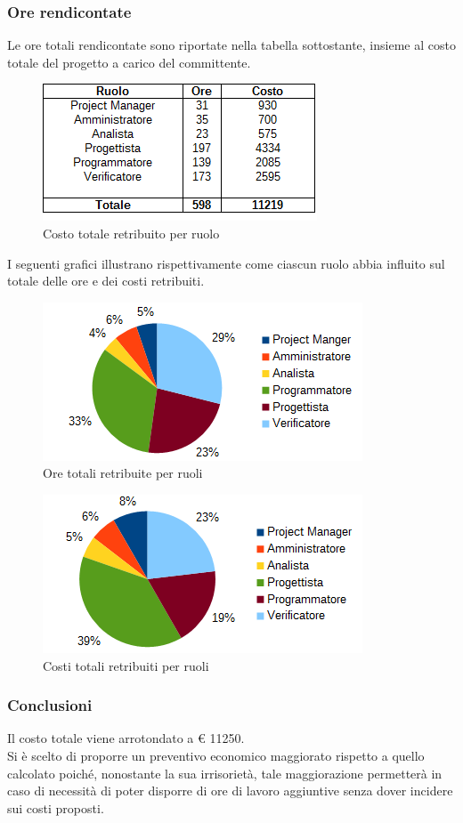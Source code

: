 		\subsubsection{Ore rendicontate}
		Le ore totali rendicontate sono riportate nella tabella sottostante, insieme al costo totale del progetto a carico del committente. \\
		\begin{figure}[H]
			\centering
			\includegraphics[scale=0.75]{immagini/tabelle/orario_rendicontato-costo.png}
			\caption{Costo totale retribuito per ruolo}
		\end{figure}
		I seguenti grafici illustrano rispettivamente come ciascun ruolo abbia influito sul totale delle ore e dei costi retribuiti. \\
		\begin{figure}[H]
		\centering
			\includegraphics[scale=1]{immagini/grafici/orario_rendicontato-torta.png}
			\caption{Ore totali retribuite per ruoli}
		\end{figure}
		\begin{figure}[H]
			\centering
			\includegraphics[scale=1]{immagini/grafici/orario_rendicontato-torta-costo.png}
			\caption{Costi totali retribuiti per ruoli}
		\end{figure}
		\subsubsection{Conclusioni}
		Il costo totale viene arrotondato a € 11250. \\
		Si è scelto di proporre un preventivo economico maggiorato rispetto a quello calcolato poiché, nonostante la sua irrisorietà, tale maggiorazione permetterà in caso di necessità di poter disporre di ore di lavoro aggiuntive senza dover incidere sui costi proposti.